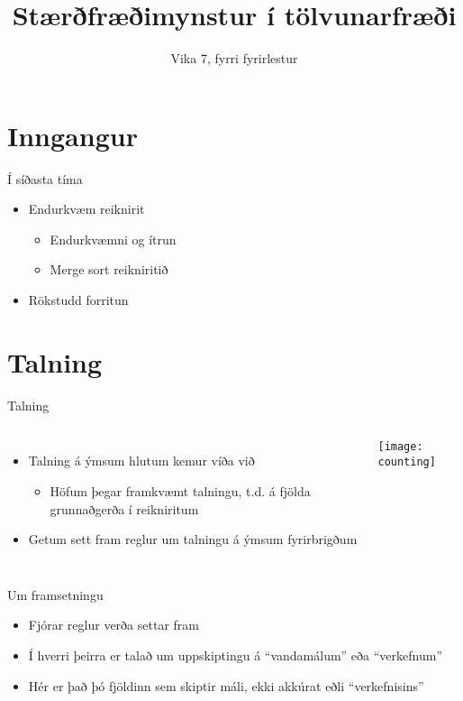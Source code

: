 \documentclass[handout]{beamer}
\title{Stærðfræðimynstur í tölvunarfræði}
\subtitle{Vika 7, fyrri fyrirlestur}
\begin{document}
\begin{frame}
\titlepage
\end{frame}


\section{Inngangur}

\begin{frame}{Í síðasta tíma}
\begin{itemize}
 \item Endurkvæm reiknirit
 \begin{itemize}
  \item Endurkvæmni og ítrun
  \item Merge sort reikniritið
 \end{itemize}
 \item Rökstudd forritun
\end{itemize}
\end{frame}

\section{Talning}

\begin{frame}{Talning}
\begin{columns}
\begin{itemize}
 \item Talning á ýmsum hlutum kemur víða við
 \begin{itemize}
  \item Höfum þegar framkvæmt talningu, t.d. á fjölda grunnaðgerða í reikniritum
 \end{itemize}
 \item Getum sett fram reglur um talningu á ýmsum fyrirbrigðum
\end{itemize}
\begin{center}
\texttt{[image: counting]}
\end{center}
\end{columns}
\end{frame}

\begin{frame}{Um framsetningu}
\begin{itemize}
 \item Fjórar reglur verða settar fram
 \item Í hverri þeirra er talað um uppskiptingu á ``vandamálum'' eða ``verkefnum''
 \item Hér er það þó fjöldinn sem skiptir máli, ekki akkúrat eðli ``verkefnisins''
\end{itemize}
\end{frame}
\end{document}
